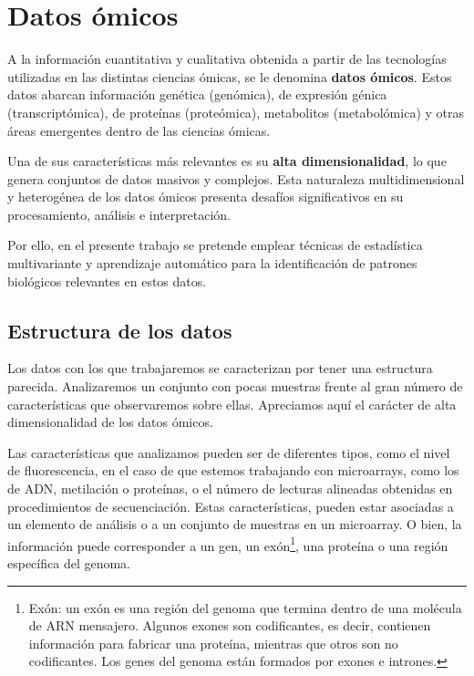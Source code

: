\section{Datos ómicos}

A la información cuantitativa y cualitativa obtenida a partir de las tecnologías utilizadas
en las distintas ciencias ómicas, se le denomina \textbf{datos ómicos}. Estos datos abarcan 
información genética (genómica), de expresión génica (transcriptómica), de proteínas (proteómica),
metabolitos (metabolómica) y otras áreas emergentes dentro de las ciencias ómicas.

Una de sus características más relevantes es su \textbf{alta dimensionalidad}, lo que genera conjuntos de datos 
masivos y complejos. Esta naturaleza multidimensional y heterogénea de los datos ómicos presenta 
desafíos significativos en su procesamiento, análisis e interpretación.

Por ello, en el presente trabajo se pretende emplear técnicas de estadística multivariante y aprendizaje
automático para la identificación de patrones biológicos relevantes en estos datos.

\subsection{Estructura de los datos}

Los datos con los que trabajaremos se caracterizan por tener una estructura parecida. Analizaremos un
conjunto con pocas muestras frente al gran número de características que observaremos sobre ellas. Apreciamos
aquí el carácter de alta dimensionalidad de los datos ómicos. \newline

Las características que analizamos pueden ser de diferentes tipos, como el nivel de fluorescencia, en el caso
de que estemos trabajando con microarrays, como los de ADN, metilación o proteínas, o el número de lecturas 
alineadas obtenidas en procedimientos de secuenciación. Estas características, pueden estar asociadas a un
elemento de análisis o a un conjunto de muestras en un microarray. O bien, la información puede corresponder a
un gen, un exón\footnote{Exón: un exón es una región del genoma que termina dentro de una molécula de ARN mensajero.
Algunos exones son codificantes, es decir, contienen información para fabricar una proteína, mientras que otros 
son no codificantes. Los genes del genoma están formados por exones e intrones.},
una proteína o una región específica del genoma. \newline


